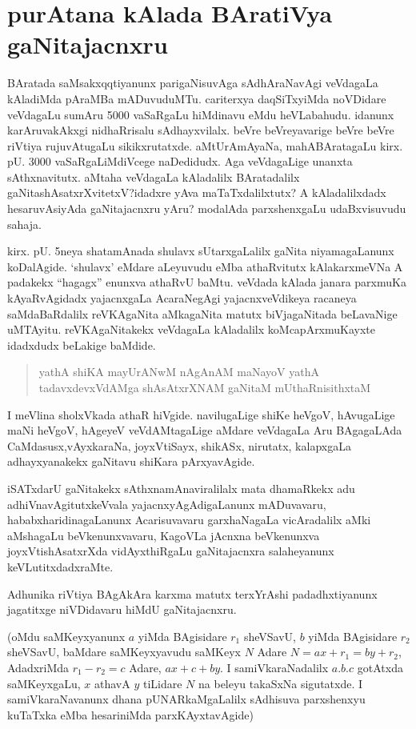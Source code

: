 \chapter{purAtana kAlada BAratiVya gaNitajacnxru}

 BAratada saMsakxqqtiyanunx parigaNisuvAga sAdhAraNavAgi veVdagaLa kAladiMda pAraMBa mADuvuduMTu. cariterxya daqSiTxyiMda noVDidare veVdagaLu sumAru {\rm 5000} vaSaRgaLu hiMdinavu eMdu heVLabahudu. idanunx karAruvakAkxgi nidhaRrisalu sAdhayx\-vilalx. beVre beVreyavarige beVre beVre riVtiya rujuvAtugaLu sikikxrutatxde. aMtU\break rAmAyaNa, mahABAratagaLu kirx. pU. {\rm 3000} vaSaRgaLiMdiVcege naDedidudx. Aga veVdagaLige unanxta sAthxnavitutx. aMtaha veVdagaLa kAladalilx BAratadalilx gaNitashAsatxrXvitetxV?\break idadxre yAva maTaTxdalilxtutx? A kAladalilxdadx hesaruvAsiyAda gaNitajacnxru yAru? modalAda parxshenxgaLu udaBxvisuvudu sahaja.

kirx. pU. {\rm 5}neya shatamAnada shulavx sUtarxgaLalilx gaNita niyamagaLanunx koDalAgide. `shulavx' eMdare aLeyuvudu eMba athaRvitutx kAlakarxmeVNa A padakekx ``hagagx'' enunxva athaRvU baMtu. veVdada kAlada janara parxmuKa kAyaRvAgidadx yajacnxgaLa AcaraNegAgi yajacnxveVdikeya racaneya saMdaBaRdalilx reVKAgaNita aMkagaNita matutx biVja\-gaNitada beLavaNige uMTAyitu. reVKAgaNitakekx veVdagaLa kAladalilx koMca\break pArxmuKayxte idadxdudx beLakige baMdide.
\begin{verse}
yathA shiKA mayUrANwM nAgAnAM maNayoV yathA\\
tadavxdevxVdAMga shAsAtxrXNAM gaNitaM mUthaRnisithxtaM
\end{verse}

I meVlina sholxVkada athaR hiVgide. navilugaLige shiKe heVgoV, hAvugaLige maNi heVgoV, hAgeyeV veVdAMtagaLige aMdare veVdagaLa Aru BAgagaLAda CaMdasusx,\break vAyxkaraNa, joyxVtiSayx, shikASx, nirutatx, kalapxgaLa adhayxyanakekx gaNitavu shiKara pArxyavAgide.

iSATxdarU gaNitakekx sAthxnamAnaviralilalx mata dhamaRkekx adu adhiVnavAgitutx\break keVvala yajacnxyAgAdigaLanunx mADuvavaru, hababxharidinagaLanunx Acarisuvavaru garxhaNa\-gaLa vicAradalilx aMki aMshagaLu beVkenunxvavaru, KagoVLa jAcnxna beVkenunxva joyxVti\-shAsatxrXda vidAyxthiRgaLu gaNitajacnxra salaheyanunx keVLutitxdadxraMte.

Adhunika riVtiya BAgAkAra karxma matutx terxYrAshi padadhxtiyanunx jagatitxge niVDidavaru hiMdU gaNitajacnxru.

(oMdu saMKeyxyanunx $a$ yiMda BAgisidare $r_{1}$ sheVSavU, $b$ yiMda BAgisidare $r_{2}$ sheVSavU, baMdare saMKeyxyavudu saMKeyx $N$ Adare $N=ax+r_{1}=by+r_{2}$, AdadxriMda $r_{1}-r_{2}=c$ Adare, $ax+c+by$. I samiVkaraNadalilx $a. b. c$ gotAtxda saMKeyxgaLu, $x$ athavA $y$ tiLidare $N$ na beleyu takaSxNa sigutatxde. I samiVkaraNavanunx dhana pUNARkaMgaLalilx sAdhisuva parxshenxyu kuTaTxka eMba hesariniMda parxKAyxtavAgide)

